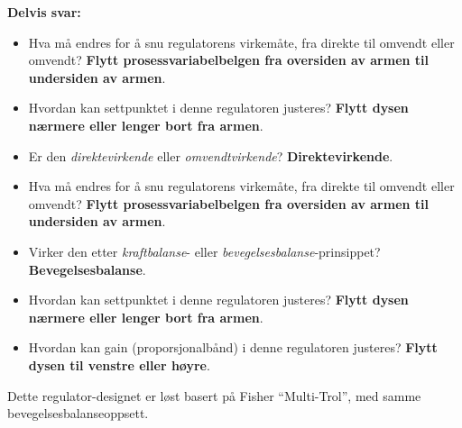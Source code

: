 
\noindent
{\bf Delvis svar:}

\vskip 10pt

\begin{itemize}
\item{} Hva må endres for å snu regulatorens virkemåte, fra direkte til omvendt eller omvendt? {\bf Flytt prosessvariabelbelgen fra oversiden av armen til undersiden av armen}.
\vskip 5pt
\item{} Hvordan kan settpunktet i denne regulatoren justeres? {\bf Flytt dysen nærmere eller lenger bort fra armen}.
\end{itemize}








\begin{itemize}
\item{} Er den {\it direktevirkende} eller {\it omvendtvirkende}? {\bf Direktevirkende}.
\vskip 5pt
\item{} Hva må endres for å snu regulatorens virkemåte, fra direkte til omvendt eller omvendt? {\bf Flytt prosessvariabelbelgen fra oversiden av armen til undersiden av armen}.
\vskip 5pt
\item{} Virker den etter {\it kraftbalanse}- eller {\it bevegelsesbalanse}-prinsippet? {\bf Bevegelsesbalanse}.
\vskip 5pt
\item{} Hvordan kan settpunktet i denne regulatoren justeres? {\bf Flytt dysen nærmere eller lenger bort fra armen}.
\vskip 5pt
\item{} Hvordan kan gain (proporsjonalbånd) i denne regulatoren justeres? {\bf Flytt dysen til venstre eller høyre}.
\end{itemize}

\vskip 10pt

Dette regulator-designet er løst basert på Fisher ``Multi-Trol'', med samme bevegelsesbalanseoppsett.



